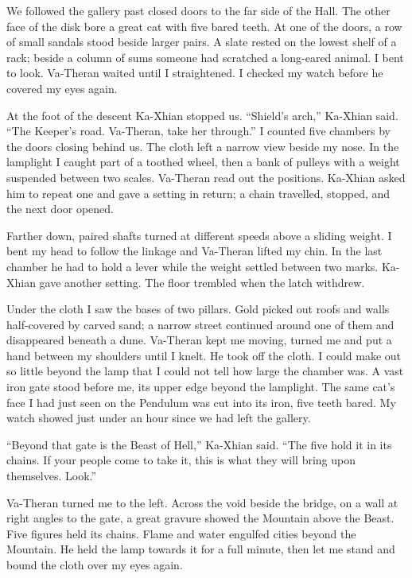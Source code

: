 We followed the gallery past closed doors to the far side of the Hall. The other face of the disk bore a great cat with five bared teeth. At one of the doors, a row of small sandals stood beside larger pairs. A slate rested on the lowest shelf of a rack; beside a column of sums someone had scratched a long-eared animal. I bent to look. Va-Theran waited until I straightened. I checked my watch before he covered my eyes again.\par

At the foot of the descent Ka-Xhian stopped us. ``Shield's arch,'' Ka-Xhian said. ``The Keeper's road. Va-Theran, take her through.'' I counted five chambers by the doors closing behind us. The cloth left a narrow view beside my nose. In the lamplight I caught part of a toothed wheel, then a bank of pulleys with a weight suspended between two scales. Va-Theran read out the positions. Ka-Xhian asked him to repeat one and gave a setting in return; a chain travelled, stopped, and the next door opened.\par

Farther down, paired shafts turned at different speeds above a sliding weight. I bent my head to follow the linkage and Va-Theran lifted my chin. In the last chamber he had to hold a lever while the weight settled between two marks. Ka-Xhian gave another setting. The floor trembled when the latch withdrew.\par

Under the cloth I saw the bases of two pillars. Gold picked out roofs and walls half-covered by carved sand; a narrow street continued around one of them and disappeared beneath a dune. Va-Theran kept me moving, turned me and put a hand between my shoulders until I knelt. He took off the cloth. I could make out so little beyond the lamp that I could not tell how large the chamber was. A vast iron gate stood before me, its upper edge beyond the lamplight. The same cat's face I had just seen on the Pendulum was cut into its iron, five teeth bared. My watch showed just under an hour since we had left the gallery.\par

``Beyond that gate is the Beast of Hell,'' Ka-Xhian said. ``The five hold it in its chains. If your people come to take it, this is what they will bring upon themselves. Look.''\par

Va-Theran turned me to the left. Across the void beside the bridge, on a wall at right angles to the gate, a great gravure showed the Mountain above the Beast. Five figures held its chains. Flame and water engulfed cities beyond the Mountain. He held the lamp towards it for a full minute, then let me stand and bound the cloth over my eyes again.\par

